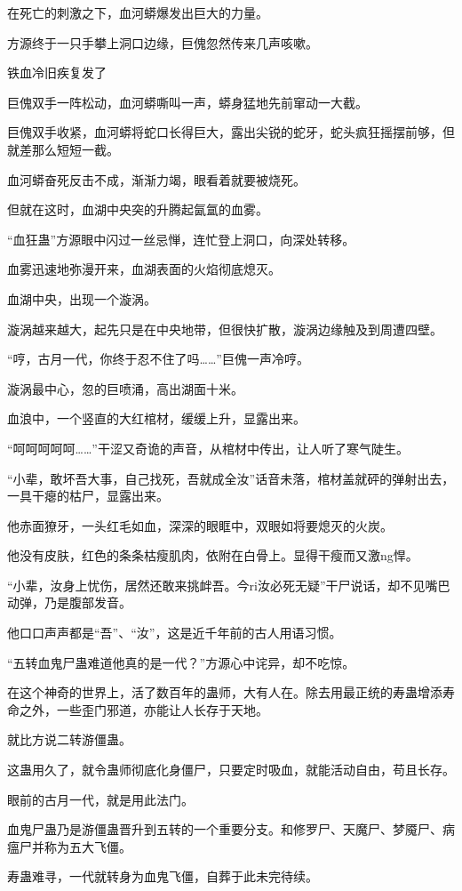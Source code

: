 \begin{this_body}
在死亡的刺激之下，血河蟒爆发出巨大的力量。

方源终于一只手攀上洞口边缘，巨傀忽然传来几声咳嗽。

铁血冷旧疾复发了

巨傀双手一阵松动，血河蟒嘶叫一声，蟒身猛地先前窜动一大截。

巨傀双手收紧，血河蟒将蛇口长得巨大，露出尖锐的蛇牙，蛇头疯狂摇摆前够，但就差那么短短一截。

血河蟒奋死反击不成，渐渐力竭，眼看着就要被烧死。

但就在这时，血湖中央突的升腾起氤氲的血雾。

“血狂蛊”方源眼中闪过一丝忌惮，连忙登上洞口，向深处转移。

血雾迅速地弥漫开来，血湖表面的火焰彻底熄灭。

血湖中央，出现一个漩涡。

漩涡越来越大，起先只是在中央地带，但很快扩散，漩涡边缘触及到周遭四壁。

“哼，古月一代，你终于忍不住了吗……”巨傀一声冷哼。

漩涡最中心，忽的巨喷涌，高出湖面十米。

血浪中，一个竖直的大红棺材，缓缓上升，显露出来。

“呵呵呵呵呵……”干涩又奇诡的声音，从棺材中传出，让人听了寒气陡生。

“小辈，敢坏吾大事，自己找死，吾就成全汝”话音未落，棺材盖就砰的弹射出去，一具干瘪的枯尸，显露出来。

他赤面獠牙，一头红毛如血，深深的眼眶中，双眼如将要熄灭的火炭。

他没有皮肤，红色的条条枯瘦肌肉，依附在白骨上。显得干瘦而又激ng悍。

“小辈，汝身上忧伤，居然还敢来挑衅吾。今ri汝必死无疑”干尸说话，却不见嘴巴动弹，乃是腹部发音。

他口口声声都是“吾”、“汝”，这是近千年前的古人用语习惯。

“五转血鬼尸蛊难道他真的是一代？”方源心中诧异，却不吃惊。

在这个神奇的世界上，活了数百年的蛊师，大有人在。除去用最正统的寿蛊增添寿命之外，一些歪门邪道，亦能让人长存于天地。

就比方说二转游僵蛊。

这蛊用久了，就令蛊师彻底化身僵尸，只要定时吸血，就能活动自由，苟且长存。

眼前的古月一代，就是用此法门。

血鬼尸蛊乃是游僵蛊晋升到五转的一个重要分支。和修罗尸、天魔尸、梦魇尸、病瘟尸并称为五大飞僵。

寿蛊难寻，一代就转身为血鬼飞僵，自葬于此未完待续。

\end{this_body}

